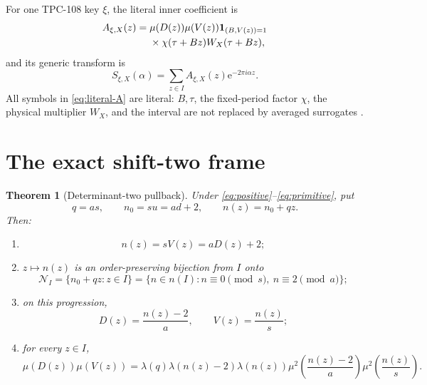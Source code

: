 \documentclass[11pt]{article}
\newtheorem{theorem}{Theorem}[section]
\theoremstyle{definition}
\theoremstyle{remark}
\newcommand{\e}{\mathrm e}
\newcommand{\one}{\mathbf 1}
\begin{document}
For one TPC-108 key \(\xi\), the literal inner coefficient is
\begin{align}
 A_{\xi,X}(z)
 ={}&
 \mu(D(z))\mu(V(z))
 \one_{(B,V(z))=1}
\notag\\
 &\times
 \chi(\tau+Bz)W_X(\tau+Bz),
\label{eq:literal-A}
\end{align}
and its generic transform is
\begin{equation}
 S_{\xi,X}(\alpha)
 =
 \sum_{z\in I}A_{\xi,X}(z)\e^{-2\pi i\alpha z}.
\label{eq:literal-S}
\end{equation}
All symbols in \eqref{eq:literal-A} are literal: \(B,\tau\), the
fixed-period factor \(\chi\), the physical multiplier \(W_X\), and
the interval are not replaced by averaged surrogates
\citep{WangTPC108}.

\section{The exact shift-two frame}

\begin{theorem}[Determinant-two pullback]
\label{thm:pullback}
Under \eqref{eq:positive}--\eqref{eq:primitive}, put
\begin{equation}
 q=as,\qquad n_0=su=ad+2,\qquad n(z)=n_0+qz.
\label{eq:n-frame}
\end{equation}
Then:
\begin{enumerate}[label=(\roman*),leftmargin=2.2em]
\item
\[
 n(z)=sV(z)=aD(z)+2;
\]
\item \(z\mapsto n(z)\) is an order-preserving bijection from \(I\)
onto
\begin{equation}
 \mathcal N_I
 =
 \{n_0+qz:z\in I\}
 =
 \{n\in n(I):n\equiv0\pmod s,\ n\equiv2\pmod a\};
\label{eq:progression}
\end{equation}
\item on this progression,
\[
 D(z)=\frac{n(z)-2}{a},
 \qquad
 V(z)=\frac{n(z)}s;
\]
\item for every \(z\in I\),
\begin{equation}
 \boxed{
 \mu(D(z))\mu(V(z))
 =
 \lambda(q)\lambda(n(z)-2)\lambda(n(z))
 \mu^2\!\left(\frac{n(z)-2}{a}\right)
 \mu^2\!\left(\frac{n(z)}s\right).}
\label{eq:mobius-pullback}
\end{equation}
\end{enumerate}
\end{theorem}
\end{document}

